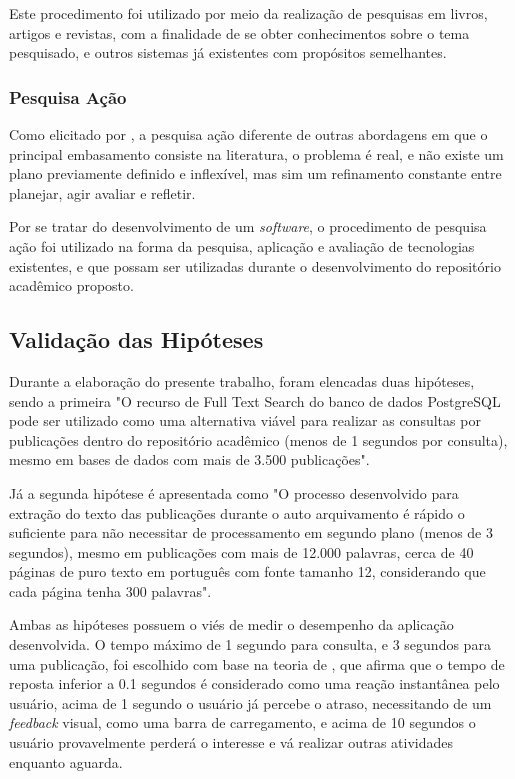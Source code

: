 Este procedimento foi utilizado por meio da realização de pesquisas
em livros, artigos e revistas, com a finalidade de se obter
conhecimentos sobre o tema pesquisado, e outros sistemas
já existentes com propósitos semelhantes.

\subsubsection{Pesquisa Ação}

Como elicitado por \citep[p. 45]{LOVATO:metodologia}, a pesquisa ação
diferente de outras abordagens em que o principal
embasamento consiste na literatura, o problema é real, e não existe
um plano previamente definido e inflexível, mas sim um refinamento
constante entre planejar, agir avaliar e refletir.

Por se tratar do desenvolvimento de um \emph{software}, o procedimento
de pesquisa ação foi utilizado na forma da pesquisa,
aplicação e avaliação de tecnologias existentes, e que possam
ser utilizadas durante o desenvolvimento do repositório
acadêmico proposto.

\subsection{Validação das Hipóteses}

Durante a elaboração do presente trabalho, foram elencadas
duas hipóteses, sendo a primeira "O recurso de Full Text
Search do banco de dados PostgreSQL pode ser utilizado como
uma alternativa viável para realizar as consultas por publicações
dentro do repositório acadêmico (menos de 1 segundos por consulta),
mesmo em bases de dados com mais de 3.500 publicações".

Já a segunda hipótese é apresentada como "O processo desenvolvido
para extração do texto das publicações durante o auto arquivamento
é rápido o suficiente para não necessitar de processamento em segundo
plano (menos de 3 segundos), mesmo em publicações com mais de 12.000 palavras,
cerca de 40 páginas de puro texto em português com fonte tamanho 12, considerando
que cada página tenha 300 palavras".

Ambas as hipóteses possuem o viés de medir o desempenho da aplicação
desenvolvida. O tempo máximo de 1 segundo para consulta, e 3 segundos
para uma publicação, foi escolhido com base na teoria de \cite{1994:Nielsen},
que afirma que o tempo de reposta inferior a 0.1 segundos é considerado
como uma reação instantânea pelo usuário, acima de 1 segundo o usuário
já percebe o atraso, necessitando de um \emph{feedback} visual, como uma
barra de carregamento, e acima de 10 segundos o usuário provavelmente perderá
o interesse e vá realizar outras atividades enquanto aguarda.

